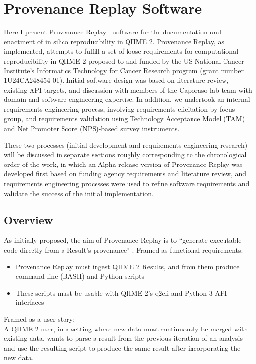 \chapter{Provenance Replay Software}

Here I present Provenance Replay ‐ software for the documentation and enactment
of in silico reproducibility in QIIME 2. Provenance Replay, as implemented,
attempts to fulfill a set of loose requirements for computational
reproducibility in QIIME 2 proposed to and funded by the US National Cancer
Institute’s Informatics Technology for Cancer Research program (grant number
1U24CA248454-01). Initial software design was based on literature review,
existing API targets, and discussion with members of the Caporaso lab team
with domain and software engineering expertise. In addition, we undertook an
internal requirements engineering process, involving requirements elicitation by
focus group, and requirements validation using Technology Acceptance Model (TAM)
\parencite{davis_perceived_1989} and Net Promoter Score
\parencite{reichheld_one_2003} (NPS)-based survey instruments.

These two processes (initial development and requirements
engineering research) will be discussed in separate sections roughly
corresponding to the chronological order of the work, in which an Alpha release
version of Provenance Replay was developed first based on funding agency
requirements and literature review, and requirements engineering processes were
used to refine software requirements and validate the success of the initial
implementation.

\section{Overview}

As initially proposed, the aim of Provenance Replay is to “generate executable
code directly from a Result’s provenance” \parencite{caporaso_nci_2022}.
Framed as functional requirements:
\begin{itemize}
    \item Provenance Replay must ingest QIIME 2 Results, and from them produce
        command-line (BASH) and Python scripts
    \item These scripts must be usable with QIIME 2’s q2cli and Python 3 API interfaces
\end{itemize}

\noindent Framed as a user story: \\
A QIIME 2 user, in a setting where new data must continuously be
merged with existing data, wants to parse a result from the previous iteration
of an analysis and use the resulting script to produce the same result after
incorporating the new data. 

